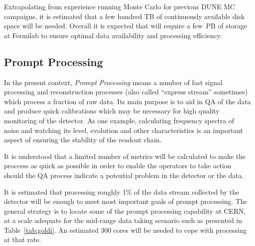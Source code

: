 Extrapolating from experience running Monte Carlo for previous DUNE MC campaigns,
it is estimated that  a few hundred TB of continuously available disk space will be needed. Overall it is expected that \pdsp will require
a few~PB of storage at Fermilab to ensure optimal data availability and  processing efficiency. 

\subsection{Prompt Processing}
\label{sec:prompt_processing}

In the present context, \textit{Prompt Processing} means a number of fast signal processing and reconstruction processes
(also called ``express stream'' sometimes) which process a fraction of raw data. Its main purpose is to aid in QA of the data
and produce quick calibrations which may be necessary for high quality monitoring of the detector. As one example,
calculating frequency spectra of noise and watching its level, evolution and other characteristics is an important aspect of ensuring
the stability of the readout chain.

It is understood
that a limited number of metrics will be calculated to make the proccess as quick as possible in order to enable
the operators to take action should the QA process indicate a potential problem in the detector or the data.

It is estimated that processing roughly 1\% of the data stream collected by the detector will
be enough to meet most important goals of prompt processing. 
The general strategy is to locate some of the prompt processing capability at CERN, at a scale adequate for the mid-range
data taking scenario such as presented in Table\, \ref{tab:goldi}. An estimated 300 cores
will be needed to cope with processing at that rate.

